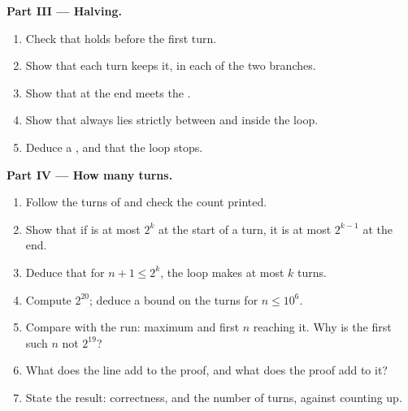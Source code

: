 \begin{problem}
\medskip\noindent\textbf{Part III --- Halving.}
\begin{enumerate}[resume]
  \item Check that  holds before the first turn.
  \item Show that each turn keeps it, in each of the two branches.
  \item Show that at the end  meets the .
  \item Show that  always lies strictly between  and  inside the loop.
  \item Deduce a , and that the loop stops.
\end{enumerate}

\medskip\noindent\textbf{Part IV --- How many turns.}
\begin{enumerate}[resume]
  \item Follow the turns of  and check the count printed.
  \item Show that if  is at most $2^k$ at the start of a turn, it is at most $2^{k - 1}$ at the end.
  \item Deduce that for $n + 1 \le 2^k$, the loop makes at most $k$ turns.
  \item Compute $2^{20}$; deduce a bound on the turns for $n \le 10^6$.
  \item Compare with the run: maximum and first $n$ reaching it. Why is the first such $n$ not $2^{19}$?
  \item What does the line  add to the proof, and what does the proof add to it?
  \item State the result: correctness,  and the number of turns, against counting up.
\end{enumerate}
\end{problem}

